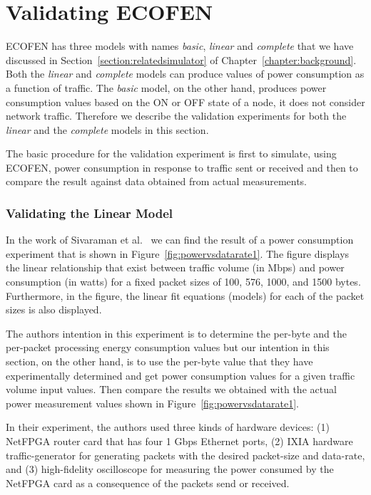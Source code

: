 \section{Validating ECOFEN}
ECOFEN has three models with names \emph{basic}, \emph{linear} and \emph{complete} that we have discussed in Section~\ref{section:relatedsimulator} of Chapter~\ref{chapter:background}. Both the \emph{linear} and \emph{complete} models can produce values of power consumption as a function of traffic. The  \emph{basic} model, on the other hand, produces power consumption values based on the ON or OFF state of a node, it does not consider network traffic. Therefore we describe the validation experiments for both the \emph{linear} and the \emph{complete} models in this section. 
 
The basic procedure for the validation experiment is first to simulate, using ECOFEN, power consumption in response to traffic sent or received and then to compare the result against data obtained from actual measurements.
\subsubsection{Validating the Linear Model}
In the work of Sivaraman et al.{\ }\cite{Sivaraman} we can find the result of a power consumption experiment that is shown in Figure~\ref{fig:powervsdatarate1}. The figure displays the linear relationship that exist between traffic volume (in Mbps) and power consumption (in watts) for a fixed packet sizes of 100, 576, 1000, and 1500 bytes. Furthermore, in the figure, the linear fit equations (models) for each of the packet sizes is also displayed. 

The authors intention in this experiment is to determine the per-byte and the per-packet processing energy consumption values but our intention in this section, on the other hand, is to use the per-byte value that they have experimentally determined and get power consumption values for a given traffic volume input values. Then compare the results we obtained with the actual power measurement values shown in Figure~\ref{fig:powervsdatarate1}.

In their experiment, the authors used three kinds of hardware devices: (1) NetFPGA router card that has four 1 Gbps Ethernet ports, (2) IXIA hardware traffic-generator for generating packets with the desired packet-size and data-rate, and (3) high-fidelity oscilloscope for measuring the power consumed by the NetFPGA card as a consequence of the packets send or received. 

